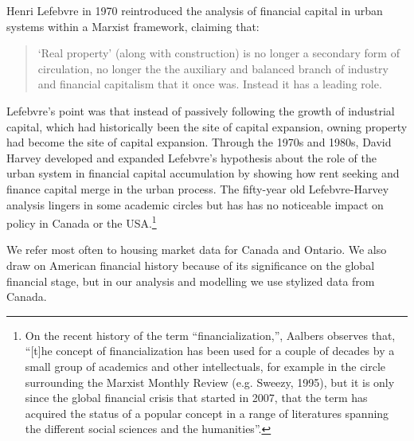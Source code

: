 Henri Lefebvre in 1970 %
\cite{lefebvreRevolutionUrbaine1970, lefebvreUrbanRevolution2003} reintroduced the analysis of financial capital in urban systems within a Marxist framework, claiming that:
\begin{quotation}
\noindent ‘Real property’ (along with construction) is no longer a secondary form of circulation, no longer the the auxiliary and balanced branch of industry and financial capitalism that it once was. Instead it has a leading role.  
\end{quotation}
Lefebvre's point was that instead of passively following the growth of industrial capital, which had historically been the site of capital expansion,  owning property  had  become the site of capital expansion.  Through the 1970s and 1980s, David Harvey \cite{harveyClassmonopolyRentFinance1974} developed and expanded Lefebvre’s  hypothesis about the role of the urban system in financial capital accumulation by showing how rent seeking and finance capital merge in the urban process. The fifty-year old Lefebvre-Harvey analysis lingers in some academic circles but has has no noticeable impact on policy in Canada or the USA.\footnote{On the recent history of the term ``financialization,'', Aalbers observes that, ``[t]he concept of financialization has been used for a couple of decades by a small group of academics and other intellectuals, for example in the circle surrounding the Marxist Monthly Review (e.g. Sweezy, 1995), but it is only since the global financial crisis that started in 2007, that the term has acquired the status of a popular concept in a range of literatures spanning the different social sciences and the humanities''\cite{aalbersVariegatedFinancializationHousing2017}.}  



We refer most often to housing market data for Canada and Ontario. We also draw on American financial history because of its significance on the global financial stage, but in our analysis and modelling we use stylized data from Canada. 




